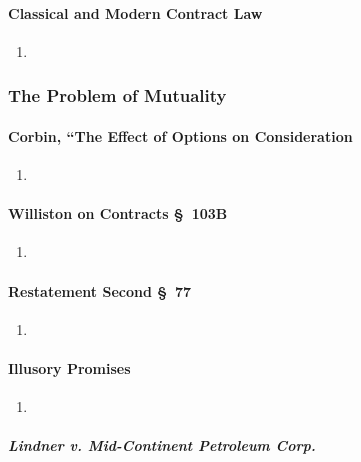 \paragraph{Classical and Modern Contract Law}

\begin{enumerate}
    \item %
\end{enumerate}

\subsubsection{The Problem of Mutuality}

\paragraph{Corbin, ``The Effect of Options on Consideration}

\begin{enumerate}
    \item %
\end{enumerate}

\paragraph{Williston on Contracts \S\ 103B}

\begin{enumerate}
    \item %
\end{enumerate}

\paragraph{Restatement Second \S\ 77}

\begin{enumerate}
    \item %
\end{enumerate}

\paragraph{Illusory Promises}

\begin{enumerate}
    \item %
\end{enumerate}

\paragraph{\emph{Lindner v. Mid-Continent Petroleum Corp.}}

